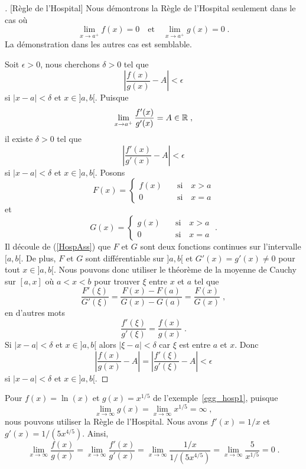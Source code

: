 {\begin{proof}[\theory][Règle de l'Hospital]
Nous démontrons la Règle de l'Hospital seulement dans le cas où
\begin{equation}\label{HospAss}
\lim_{x\rightarrow a^+} f(x) = 0 \quad \text{et} \quad
\lim_{x\rightarrow a^+} g(x) = 0 \; .
\end{equation}
La démonstration dans les autres cas est semblable.

Soit $\epsilon>0$, nous cherchons $\delta >0$ tel que
\[
\left| \frac{f(x)}{g(x)} - A \right| < \epsilon
\]
si $|x-a| < \delta$ et $x\in ]a,b[$.  Puisque
\[
\lim_{x\rightarrow a^+} \frac{f'(x)}{g'(x)} = A \in \mathbb{R} \; ,
\]
il existe $\delta >0$ tel que
\[
\left| \frac{f'(x)}{g'(x)} - A \right| < \epsilon
\]
si $|x-a|< \delta$ et $x\in ]a,b[$.  Posons
\[
F(x) = \begin{cases} f(x) & \quad \text{si} \quad x > a \\
0 & \quad \text{si}\quad  x=a
\end{cases}
\]
et
\[
G(x) = \begin{cases} g(x) & \quad \text{si} \quad x > a \\
0 & \quad \text{si}\quad  x=a
\end{cases} \; .
\]
Il découle de (\ref{HospAss}) que $F$ et $G$ sont deux fonctions
continues sur l'intervalle $[a,b[$.  De plus, $F$ et $G$ sont
différentiable sur $]a,b[$ et $G'(x) = g'(x) \neq 0$ pour tout
$x\in ]a,b[$.  Nous pouvons donc utiliser le théorème de la moyenne de
Cauchy sur $[a,x]$ où $a<x<b$ pour trouver $\xi$ entre $x$ et $a$ tel
que
\[
\frac{F'(\xi)}{G'(\xi)} = \frac{F(x)-F(a)}{G(x)-G(a)} =
\frac{F(x)}{G(x)} \; ,
\]
en d'autres mots
\[
\frac{f'(\xi)}{g'(\xi)} = \frac{f(x)}{g(x)} \; .
\]
Si $|x-a| < \delta$ et $x\in ]a,b[$ alors $|\xi-a| < \delta$ car $\xi$
est entre $a$ et $x$.  Donc
\[
\left| \frac{f(x)}{g(x)} - A \right| =
\left| \frac{f'(\xi)}{g'(\xi)} - A \right| < \epsilon
\]
si $|x-a| < \delta$ et $x \in ]a,b[$.
\end{proof}

\begin{egg}
Pour $f(x) = \ln(x)$ et $g(x)= x^{1/5}$ de l'exemple~\ref{egg_hosp1},
puisque
\[
\lim_{x\rightarrow \infty} g(x) = \lim_{x\rightarrow \infty} x^{1/5}
= \infty \; ,
\]
nous pouvons utiliser la Règle de l'Hospital.  Nous avons $f'(x) = 1/x$ et
$g'(x) = 1/(5x^{4/5})$.  Ainsi,
\[
\lim_{x\rightarrow \infty} \frac{f(x)}{g(x)}
= \lim_{x\rightarrow \infty} \frac{f'(x)}{g'(x)}
= \lim_{x\rightarrow \infty} \frac{1/x}{1/(5x^{4/5})}
=  \lim_{x\rightarrow \infty} \frac{5}{x^{1/5}} = 0 \; .
\]
\end{egg}

}

